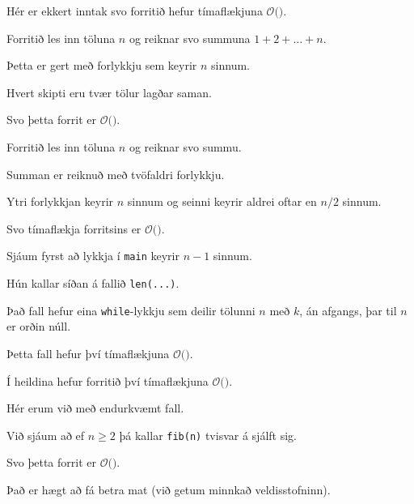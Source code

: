 {
	{
		\item<1-> Hér er ekkert inntak svo forritið hefur tímaflækjuna $\mathcal{O}($\onslide<2->{$\ 1\ $}$)$.
	}
}

{
	{
		\item<1-> Forritið les inn töluna $n$ og reiknar svo summuna $1 + 2 + \dots + n$.
		\item<2-> Þetta er gert með forlykkju sem keyrir $n$ sinnum.
		\item<3-> Hvert skipti eru tvær tölur lagðar saman.
		\item<4-> Svo þetta forrit er $\mathcal{O}($\onslide<5->{$\ n\ $}$)$.
	}
}

{
	{
		\item<1-> Forritið les inn töluna $n$ og reiknar svo summu.
		\item<2-> Summan er reiknuð með tvöfaldri forlykkju.
		\item<3-> Ytri forlykkjan keyrir $n$ sinnum og seinni keyrir aldrei oftar en $n/2$ sinnum.
		\item<4-> Svo tímaflækja forritsins er $\mathcal{O}($\onslide<5->{$n^2$}$)$.
	}
}

{
	{
		\item<1-> Sjáum fyrst að lykkja í \texttt{main} keyrir $n - 1$ sinnum.
		\item<2-> Hún kallar síðan á fallið \texttt{len(...)}.
		\item<3-> Það fall hefur eina \texttt{while}-lykkju sem deilir tölunni $n$ með $k$, án afgangs, þar til $n$ er orðin núll.
		\item<4-> Þetta fall hefur því tímaflækjuna $\mathcal{O}($\onslide<5->{$\log n$}$)$.
		\item<6-> Í heildina hefur forritið því tímaflækjuna $\mathcal{O}($\onslide<7->{$n \log n$}$)$.
	}
}

{
	{
		\item<1-> Hér erum við með endurkvæmt fall.
		\item<2-> Við sjáum að ef $n \geq 2$ þá kallar \texttt{fib(n)} tvisvar á sjálft sig.
		\item<3-> Svo þetta forrit er $\mathcal{O}($\onslide<4->{$2^n$}$)$.
		\item<5-> Það er hægt að fá betra mat (við getum minnkað veldisstofninn).
	}
}

